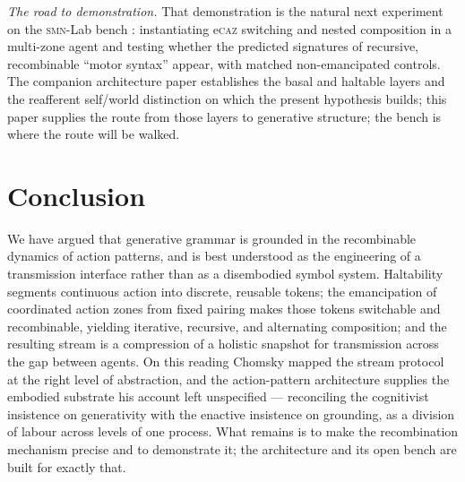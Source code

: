 \documentclass{article}
\newcommand{\smn}{\textsc{smn}}
\newcommand{\ecaz}{e\textsc{caz}}
\begin{document}
\emph{The road to demonstration.} That demonstration is the natural next experiment on the \smn-Lab bench \citep{NagarjunaKarnam2026SMN}: instantiating \ecaz{} switching and nested composition in a multi-zone agent and testing whether the predicted signatures of recursive, recombinable ``motor syntax'' appear, with matched non-emancipated controls. The companion architecture paper establishes the basal and haltable layers and the reafferent self/world distinction on which the present hypothesis builds; this paper supplies the route from those layers to generative structure; the bench is where the route will be walked.

\section{Conclusion}\label{sec:conclusion}

We have argued that generative grammar is grounded in the recombinable dynamics of action patterns, and is best understood as the engineering of a transmission interface rather than as a disembodied symbol system. Haltability segments continuous action into discrete, reusable tokens; the emancipation of coordinated action zones from fixed pairing makes those tokens switchable and recombinable, yielding iterative, recursive, and alternating composition; and the resulting stream is a compression of a holistic snapshot for transmission across the gap between agents. On this reading Chomsky mapped the stream protocol at the right level of abstraction, and the action-pattern architecture supplies the embodied substrate his account left unspecified --- reconciling the cognitivist insistence on generativity with the enactive insistence on grounding, as a division of labour across levels of one process. What remains is to make the recombination mechanism precise and to demonstrate it; the architecture and its open bench are built for exactly that.



\end{document}
